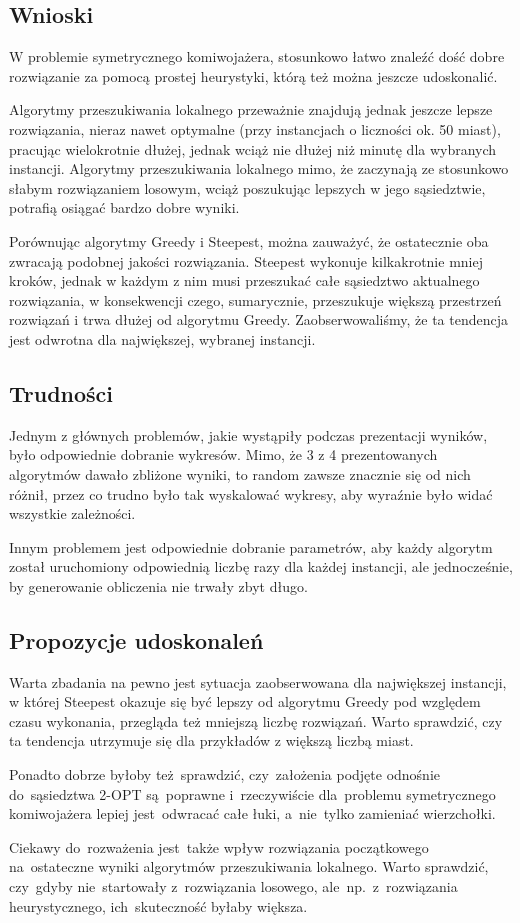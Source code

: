 \subsection{Wnioski}

W problemie symetrycznego komiwojażera, stosunkowo łatwo znaleźć dość dobre rozwiązanie za pomocą prostej heurystyki, którą też można jeszcze udoskonalić.

Algorytmy przeszukiwania lokalnego przeważnie znajdują jednak jeszcze lepsze rozwiązania, nieraz nawet optymalne (przy instancjach o liczności ok. 50 miast), pracując wielokrotnie dłużej, jednak wciąż nie dłużej niż minutę dla wybranych instancji. Algorytmy przeszukiwania lokalnego mimo, że zaczynają ze stosunkowo słabym rozwiązaniem losowym, wciąż poszukując lepszych w jego sąsiedztwie, potrafią osiągać bardzo dobre wyniki.

Porównując algorytmy Greedy i Steepest, można zauważyć, że ostatecznie oba zwracają podobnej jakości rozwiązania. Steepest wykonuje kilkakrotnie mniej kroków, jednak w każdym z nim musi przeszukać całe sąsiedztwo aktualnego rozwiązania, w konsekwencji czego, sumarycznie, przeszukuje większą przestrzeń rozwiązań i trwa dłużej od algorytmu Greedy. Zaobserwowaliśmy, że ta tendencja jest odwrotna dla największej, wybranej instancji.

\subsection{Trudności}

Jednym z głównych problemów, jakie wystąpiły podczas prezentacji wyników, było odpowiednie dobranie wykresów. Mimo, że 3 z 4 prezentowanych algorytmów dawało zbliżone wyniki, to random zawsze znacznie się od nich różnił, przez co trudno było tak wyskalować wykresy, aby wyraźnie było widać wszystkie zależności. 

Innym problemem jest odpowiednie dobranie parametrów, aby każdy algorytm został uruchomiony odpowiednią liczbę razy dla każdej instancji, ale jednocześnie, by generowanie obliczenia nie trwały zbyt długo.

\subsection{Propozycje udoskonaleń}

Warta zbadania na pewno jest sytuacja zaobserwowana dla największej instancji, w której Steepest okazuje się być lepszy od algorytmu Greedy pod względem czasu wykonania, przegląda też mniejszą liczbę rozwiązań. Warto sprawdzić, czy ta tendencja utrzymuje się dla przykładów z większą liczbą miast.

Ponadto dobrze byłoby też~sprawdzić, czy~założenia podjęte odnośnie do~sąsiedztwa 2-OPT są~poprawne i~rzeczywiście dla~problemu symetrycznego komiwojażera lepiej jest~odwracać całe łuki, a~nie~tylko zamieniać wierzchołki.

Ciekawy do~rozważenia jest~także wpływ rozwiązania początkowego na~ostateczne wyniki algorytmów przeszukiwania lokalnego. Warto sprawdzić, czy~gdyby nie~startowały z~rozwiązania losowego, ale~np.~z~rozwiązania heurystycznego, ich~skuteczność byłaby większa.